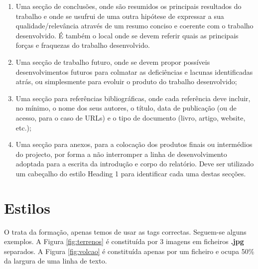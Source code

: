 \begin{enumerate}
 \item Uma secção de conclusões, onde são resumidos os principais resultados do trabalho e onde se usufrui de uma outra hipótese de expressar a sua qualidade/relevância através de um resumo conciso e coerente com o trabalho desenvolvido. É também o local onde se devem referir quais as principais forças e fraquezas do trabalho desenvolvido.
 \item Uma secção de trabalho futuro, onde se devem propor possíveis desenvolvimentos futuros para colmatar as deficiências e lacunas identificadas atrás, ou simplesmente para evoluir o produto do trabalho desenvolvido;
 \item Uma secção para referências bibliográficas, onde cada referência deve incluir, no mínimo, o nome dos seus autores, o título, data de publicação (ou de acesso, para o caso de URLs) e o tipo de documento (livro, artigo, website, etc.);
 \item Uma secção para anexos, para a colocação dos produtos finais ou intermédios do projecto, por forma a não interromper a linha de desenvolvimento adoptada para a escrita da introdução e corpo do relatório.
Deve ser utilizado um cabeçalho do estilo Heading 1 para identificar cada uma destas secções.
\end{enumerate}



\section{Estilos}

O \LaTeXe trata da formação, apenas temos de usar as tags correctas. Seguem-se alguns exemplos. A Figura \ref{fig:terrenos} é constituída por 3 imagens em ficheiros \textbf{.jpg} separados. A Figura \ref{fig:volcao} é constituída apenas por um ficheiro e ocupa 50\% da largura de uma linha de texto.


